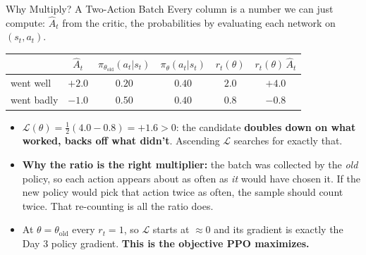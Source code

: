 \begin{frame}{Why Multiply? A Two-Action Batch}
Every column is a number we can just compute: $\hat{A}_t$ from the critic, the probabilities by evaluating each network on $(s_t,a_t)$.
\begin{center}
\small
\begin{tabular}{lccccc}
\hline
 & $\hat{A}_t$ & $\pi_{\theta_\text{old}}(a_t|s_t)$ & $\pi_\theta(a_t|s_t)$ & $r_t(\theta)$ & $r_t(\theta)\,\hat{A}_t$ \\
\hline
went well      & $+2.0$ & $0.20$ & $0.40$ & $2.0$ & $+4.0$ \\
went badly     & $-1.0$ & $0.50$ & $0.40$ & $0.8$ & $-0.8$ \\
\hline
\end{tabular}
\end{center}
\begin{itemize}
    \item $\mathcal{L}(\theta) = \tfrac{1}{2}(4.0 - 0.8) = +1.6 > 0$: the candidate \textbf{doubles down on what worked, backs off what didn't}. Ascending $\mathcal{L}$ searches for exactly that.
    \pause
    \item \textbf{Why the ratio is the right multiplier:} the batch was collected by the \emph{old} policy, so each action appears about as often as \emph{it} would have chosen it. If the new policy would pick that action twice as often, the sample should count twice. That re-counting is all the ratio does.
    \pause
    \item At $\theta = \theta_\text{old}$ every $r_t = 1$, so $\mathcal{L}$ starts at $\approx 0$ and its gradient is exactly the Day 3 policy gradient. \textbf{This is the objective PPO maximizes.}
\end{itemize}
\end{frame}

